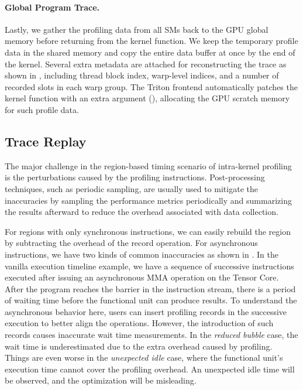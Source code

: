 \paragraph{Global Program Trace.}
Lastly, we gather the profiling data from all SMs back to the GPU global memory before returning from the kernel function. 
We keep the temporary profile data in the shared memory and copy the entire data buffer at once by the end of the kernel. 
Several extra metadata are attached for reconstructing the trace as shown in \Fig{\ref{fig:design}}, including thread block index, warp-level indices, and a number of recorded slots in each warp group. 
The Triton frontend automatically patches the kernel function with an extra argument (), allocating the GPU scratch memory for such profile data.


\subsection{Trace Replay} \label{sec:replay}



The major challenge in the region-based timing scenario of intra-kernel profiling is the perturbations caused by the profiling instructions.
Post-processing techniques, such as periodic sampling\cite{sample_based_profiling}, are usually used to mitigate the inaccuracies by sampling the performance metrics periodically and summarizing the results afterward to reduce the overhead associated with data collection.





For regions with only synchronous instructions, we can easily rebuild the region by subtracting the overhead of the record operation.
For asynchronous instructions, we have two kinds of common inaccuracies as shown in \Fig{\ref{fig:trace_replay}}.
In the vanilla execution timeline example, we have a sequence of successive instructions executed after issuing an asynchronous MMA operation on the Tensor Core.
After the program reaches the barrier in the instruction stream, there is a period of waiting time before the functional unit can produce results.
To understand the asynchronous behavior here, users can insert profiling records in the successive execution to better align the operations.
However, the introduction of such records causes inaccurate wait time measurements.
In the \emph{reduced bubble} case, the wait time is underestimated due to the extra overhead caused by profiling.
Things are even worse in the \emph{unexpected idle} case, where the functional unit's execution time cannot cover the profiling overhead.
An unexpected idle time will be observed, and the optimization will be misleading.


